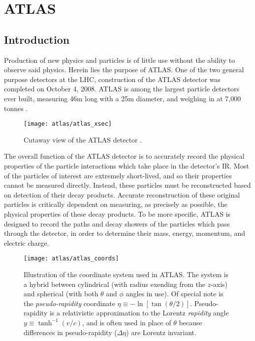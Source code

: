 \chapter{ATLAS} \label{chapter:atlas}

\section{Introduction}

    Production of new physics and particles is of little use without the ability to observe said physics.
    Herein lies the purpose of ATLAS.
    One of the two general purpose detectors at the LHC, construction of the ATLAS detector was completed on October 4, 2008.
    ATLAS is among the largest particle detectors ever built, measuring 46m long with a 25m diameter, and weighing in at 7,000 tonnes \cite{atlas_website}.

    \begin{figure}[h]
        \texttt{[image: atlas/atlas\_xsec]}
        \caption{Cutaway view of the ATLAS detector \cite{Pequenao:1095924}.}
        \label{fig:atlas_xsec}
    \end{figure}


    The overall function of the ATLAS detector is to accurately record the physical properties
        of the particle interactions which take place in the detector's IR.
    Most of the particles of interest are extremely short-lived, and so their properties cannot be measured directly.
    Instead, these particles must be reconstructed based on detection of their decay products.
    Accurate reconstruction of these original particles is critically dependent on measuring, as precisely as possible, the physical properties of these decay products.
    To be more specific, ATLAS is designed to record the paths and decay showers of the particles which pass through the detector, in order to determine their mass, energy, momentum, and electric charge.

    \begin{figure}
        \texttt{[image: atlas/atlas\_coords]}
        \caption{
            Illustration of the coordinate system used in ATLAS\cite{Schott:1699952}.
            The system is a hybrid between cylindrical (with radius exending from the $z$-axis)
                and spherical (with both $\theta$ and $\phi$ angles in use).
            Of special note is the \textit{pseudo-rapidity} coordinate $\eta \equiv -\ln[\tan(\theta/2)]$.
            Pseudo-rapidity is a relativistic approximation to the Lorentz \textit{rapidity} angle $y \equiv \tanh^{-1}(v/c)$,
                and is often used in place of $\theta$ because differences in pseudo-rapidity ($\Delta \eta$) are Lorentz invariant.
        }
        \label{fig:atlas_coords}
    \end{figure}

